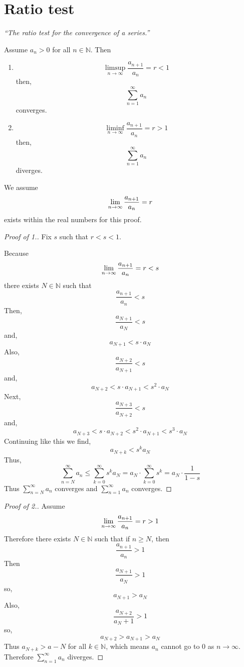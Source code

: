 \documentclass[12pt]{report}
\begin{document}
    \section{Ratio test}
    \textit{``The ratio test for the convergence of a series.''} \vspace{3mm}
    \begin{theorem}
        Assume \(a_n >0\) for all \(n \in \mathbb{N}\). Then
        \begin{enumerate}
            \item 
            \[\hyperref[Ratio test part 1]{\limsup_{n \to \infty} \frac{a_{n+1}}{a_n} = r < 1}\]
            then,
            \[\sum^\infty_{n=1} a_n\]
            converges.
            \item 
            \[\hyperref[Ratio test part 2]{\liminf_{n \to \infty} \frac{a_{n+1}}{a_n} = r > 1}\]
            then,
            \[\sum^\infty_{n=1} a_n\]
            diverges.
        \end{enumerate}
    \end{theorem}
    \label{Ratio test part 1}
    We assume \[\lim_{n \to \infty} \frac{a_{n+1}}{a_n} = r\] exists within the real numbers for this proof.
    \begin{proof}[Proof of \textnormal{1.}]
        Fix \(s\) such that \(r<s<1\).
        
        Because
        \[\lim_{n \to \infty} \frac{a_{n+1}}{a_n} = r < s \]
        there exists \(N \in \mathbb{N}\) such that
        \[\frac{a_{n+1}}{a_n} < s\]
        Then,
        \[\frac{a_{N + 1}}{a_N} < s\]
        and,
        \[a_{N+1} < s \cdot a_N\]
        Also,
        \[\frac{a_{N + 2}}{a_{N+1}} < s\]
        and,
        \[a_{N + 2}< s \cdot a_{N+1} < s^2 \cdot a_N\]
        Next,
        \[\frac{a_{N + 3}}{a_{N+2}} < s\]
        and,
        \[a_{N + 3} < s \cdot a_{N + 2}< s^2 \cdot a_{N+1} < s^3 \cdot a_N\]
        Continuing like this we find,
        \[a_{N+k} < s^k a_N\]
        Thus,
        \[\sum^\infty_{n=N} a_n \leq \sum^\infty_{k=0}s^k a_N = a_N \cdot \sum^\infty_{k=0} s^k = a_N \cdot \frac{1}{1-s}\]
        Thus \(\sum^\infty_{n=N} a_n\) converges and \(\sum^\infty_{n=1} a_n\) converges.
    \end{proof}
    \label{Ratio test part 2}
    \begin{proof}[Proof of \textnormal{2.}]
        Assume
        \[\lim_{n \to \infty} \frac{a_{n+1}}{a_n} = r > 1\]
        Therefore there exists \(N \in \mathbb{N}\) such that if \(n \geq N\), then
        \[\frac{a_{n+1}}{a_n} > 1\]
        Then
        \[\frac{a_{N+1}}{a_N} > 1\]
        so,
        \[a_{N+1} > a_N\]
        Also,
        \[\frac{a_{N+2}}{a_N+1} > 1\]
        so,
        \[a_{N+2} > a_{N+1} > a_N\]
        Thus \(a_{N+k} > a-N\) for all \(k \in \mathbb{N}\), which means \(a_n\) cannot go to \(0\) as \(n \to \infty\). Therefore \(\sum^\infty_{n=1} a_n\) diverges.
    \end{proof}
\end{document}
